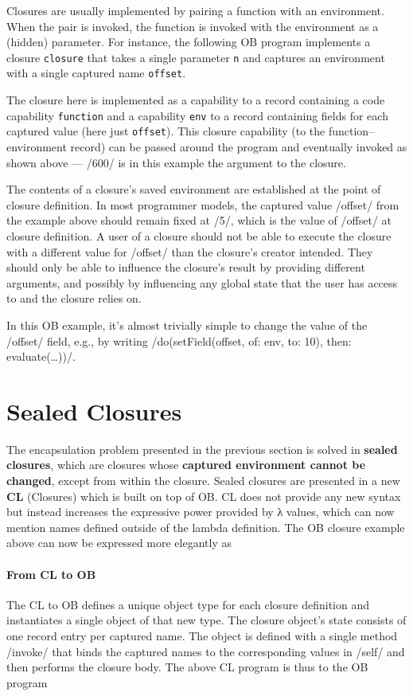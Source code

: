 \documentclass[main.tex]{subfiles}
\begin{document}
Closures are usually implemented by pairing a function with an environment. When the pair is invoked, the function is invoked with the environment as a (hidden) parameter. For instance, the following OB program implements a closure \texttt{closure} that takes a single parameter \texttt{n} and captures an environment with a single captured name \texttt{offset}.

The closure here is implemented as a capability to a record containing a code capability \texttt{function} and a capability \texttt{env} to a record containing fields for each captured value (here just \texttt{offset}). This closure capability (to the function–environment record) can be passed around the program and eventually invoked as shown above — \iil/600/ is in this example the argument to the closure.

The contents of a closure's saved environment are established at the point of closure definition. In most programmer models, the captured value \iil/offset/ from the example above should remain fixed at \iil/5/, which is the value of \iil/offset/ at closure definition. A user of a closure should not be able to execute the closure with a different value for \iil/offset/ than the closure's creator intended. They should only be able to influence the closure's result by providing different arguments, and possibly by influencing any global state that the user has access to and the closure relies on.

In this OB example, it's almost trivially simple to change the value of the \iil/offset/ field, e.g., by writing \iil/do(setField(offset, of: env, to: 10), then: evaluate(…))/.

\section{Sealed Closures} \label{sct:cls-sealed}
The encapsulation problem presented in the previous section is solved in \textbf{sealed closures}, which are closures whose \textbf{captured environment cannot be changed}, except from within the closure. Sealed closures are presented in a new  \textbf{CL} (Closures) which is built on top of OB. CL does not provide any new syntax but instead increases the expressive power provided by λ values, which can now mention names defined outside of the lambda definition. The OB closure example above can now be expressed more elegantly as

\paragraph{From CL to OB} The CL to OB  defines a unique object type for each closure definition and instantiates a single object of that new type. The closure object's state consists of one record entry per captured name. The object is defined with a single method \iil/invoke/ that binds the captured names to the corresponding values in \iil/self/ and then performs the closure body. The above CL program is thus \lowered{} to the OB program
\end{document}
